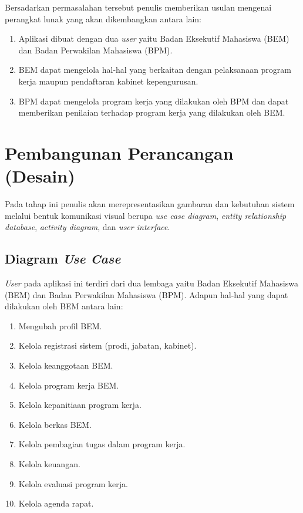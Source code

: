 Bersadarkan permasalahan tersebut penulis memberikan usulan mengenai perangkat lunak yang akan dikembangkan antara lain:

\begin{enumerate}
	\item Aplikasi dibuat dengan dua \emph{user} yaitu Badan Eksekutif Mahasiswa (BEM) dan Badan Perwakilan Mahasiswa (BPM).
	
	\item BEM dapat mengelola hal-hal yang berkaitan dengan pelaksanaan program kerja maupun pendaftaran kabinet kepengurusan.
	
	\item BPM dapat mengelola program kerja yang dilakukan oleh BPM dan dapat memberikan penilaian terhadap program kerja yang dilakukan oleh BEM.
\end{enumerate}

\section{Pembangunan Perancangan (Desain)}

Pada tahap ini penulis akan merepresentasikan gambaran dan kebutuhan sistem melalui bentuk komunikasi visual berupa \emph{use case diagram}, \emph{entity relationship database}, \emph{activity diagram}, dan \emph{user interface}.

\subsection{Diagram \emph{Use Case}}
\emph{User} pada aplikasi ini terdiri dari dua lembaga yaitu Badan Eksekutif Mahasiswa (BEM) dan Badan Perwakilan Mahasiswa (BPM). Adapun hal-hal yang dapat dilakukan oleh BEM antara lain:

\begin{enumerate}
	\item Mengubah profil BEM.
	\item Kelola registrasi sistem (prodi, jabatan, kabinet).
	\item Kelola keanggotaan BEM.
	\item Kelola program kerja BEM.
	\item Kelola kepanitiaan program kerja.
	\item Kelola berkas BEM.
	\item Kelola pembagian tugas dalam program kerja.
	\item Kelola keuangan. 
	\item Kelola evaluasi program kerja.
	\item Kelola agenda rapat.	
\end{enumerate}

